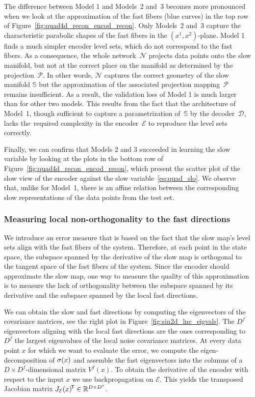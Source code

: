 \documentclass{article}
\newcommand{\enc}{\mathcal{E}} %
\newcommand{\dec}{\mathcal{D}} %
\newcommand{\net}{\mathcal{N}} %
\newcommand{\proj}{\mathcal{P}} %
\newcommand{\sman}{\mathbb{S}} %
\newcommand{\jac}[1]{J_{#1}} %
\begin{document}
The difference between Model 1 and Models~2 and~3 becomes more pronounced when we look at the approximation of the fast fibers (blue curves) in the top row of Figure~\ref{fig:quad4d_recon_encod_recon}. Only Models~2 and~3 capture the characteristic parabolic shapes of the fast fibers in the $(x^1, x^2)$-plane. Model 1 finds a much simpler encoder level sets, which do not correspond to the fast fibers. As a consequence, the whole network~$\net$ projects data points onto the slow manifold, but not at the correct place on the manifold as determined by the projection~$\proj$. In other words, $\net$ captures the correct geometry of the slow manifold $\sman$ but the approximation of the associated projection mapping~$\proj$ remains insufficient. As a result, the validation loss of Model 1 is much larger than for other two models. This results from the fact that the architecture of Model~1, though sufficient to capture a parametrization of~$\sman$ by the decoder~$\dec$, lacks the~required complexity in the encoder~$\enc$ to reproduce the level sets correctly.

Finally, we can confirm that Models 2 and 3 succeeded in learning the slow variable by looking at the plots in the bottom row of Figure~\ref{fig:quad4d_recon_encod_recon}, which present the scatter plot of the slow view of the encoder against the slow variable~\eqref{eq:quad_slo}. We observe that, unlike for Model~1, there is an affine relation between the corresponding slow representations of the data points from the test set.

\subsubsection{Measuring local non-orthogonality to the fast directions}\label{sec:ortho_err}
We introduce an error measure that is based on the fact that the slow map's level sets align with the fast fibers of the system. Therefore, at each point in the state space, the subspace spanned by the derivative of the slow map is orthogonal to the tangent space of the fast fibers of the system. Since the encoder should approximate the slow map, one way to measure the quality of this approximation is to measure the lack of orthogonality between the subspace spanned by its derivative and the subspace spanned by the local fast directions.

We can obtain the slow and fast directions by computing the eigenvectors of the covariance matrices, see the right plot in Figure~\ref{fig:sin2d_lnc_eigvals}. The $D^f$ eigenvectors aligning with the local fast directions are the ones corresponding to $D^f$ the largest eigenvalues of the local noise covariance matrices. At every data point $x$ for which we want to evaluate the error, we compute the eigen-decomposition of $\sigma(x)$ and assemble the fast eigenvectors into the columns of a $D\times D^f$-dimensional matrix $V^f(x)$. To obtain the derivative of the encoder with respect to the input $x$ we use backpropagation on $\enc$. This yields the transposed Jacobian matrix $\tp{\jac{\enc}(x)}\in\mat{D}{D^s}$.
\end{document}
